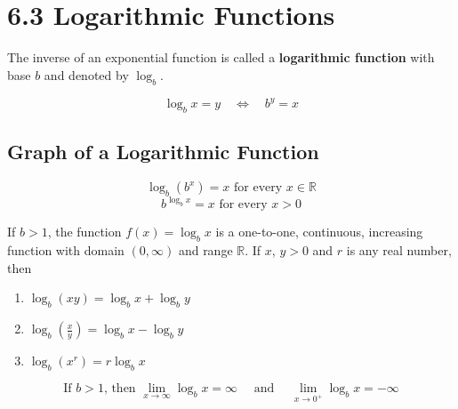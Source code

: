 %
%

\section*{6.3 Logarithmic Functions}

The inverse of an exponential function is called a \textbf{logarithmic function} with base \(b\) and denoted by \( \log_b \).

\[ \log_b{x} = y \quad \Leftrightarrow \quad b^y = x \]

\subsection*{Graph of a Logarithmic Function}

\begin{center}
\end{center}

\[ \log_b (b^x)=x \text{ for every } x \in \mathbb{R} \]
\[ b^{\log_b x} = x \text{ for every } x > 0 \]

\begin{definition}
If \(b>1\), the function \(f(x)= \log_b x \) is a one-to-one, continuous, increasing function with domain \( (0, \infty) \) and range \( \mathbb{R} \). If \(x\), \(y > 0\) and \(r\) is any real number, then 
\begin{enumerate}
\item \( \log_b(xy) = \log_b x + \log_b y \)
\item \( \log_b(\frac{x}{y}) = \log_b x - \log_b y \)
\item \( \log_b(x^r) = r \log_b x \)
\end{enumerate} 
\end{definition}

\[ \text{If } b>1 \text{, then } \lim_{x \to \infty} \log_b x = \infty \quad \text{ and } \quad \lim_{x \to 0^+} \log_b x = - \infty \]

